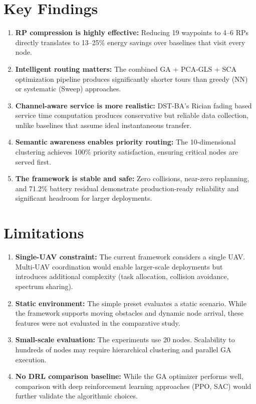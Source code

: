 \documentclass[12pt, a4paper, oneside]{report}
\begin{document}
\section{Key Findings}

\begin{enumerate}
    \item \textbf{RP compression is highly effective:} Reducing 19 waypoints to 4--6 RPs directly translates to 13--25\% energy savings over baselines that visit every node.

    \item \textbf{Intelligent routing matters:} The combined GA + PCA-GLS + SCA optimization pipeline produces significantly shorter tours than greedy (NN) or systematic (Sweep) approaches.

    \item \textbf{Channel-aware service is more realistic:} DST-BA's Rician fading based service time computation produces conservative but reliable data collection, unlike baselines that assume ideal instantaneous transfer.

    \item \textbf{Semantic awareness enables priority routing:} The 10-dimensional clustering achieves 100\% priority satisfaction, ensuring critical nodes are served first.

    \item \textbf{The framework is stable and safe:} Zero collisions, near-zero replanning, and 71.2\% battery residual demonstrate production-ready reliability and significant headroom for larger deployments.
\end{enumerate}

\section{Limitations}

\begin{enumerate}
    \item \textbf{Single-UAV constraint:} The current framework considers a single UAV. Multi-UAV coordination would enable larger-scale deployments but introduces additional complexity (task allocation, collision avoidance, spectrum sharing).

    \item \textbf{Static environment:} The simple preset evaluates a static scenario. While the framework supports moving obstacles and dynamic node arrival, these features were not evaluated in the comparative study.

    \item \textbf{Small-scale evaluation:} The experiments use 20 nodes. Scalability to hundreds of nodes may require hierarchical clustering and parallel GA execution.

    \item \textbf{No DRL comparison baseline:} While the GA optimizer performs well, comparison with deep reinforcement learning approaches (PPO, SAC) would further validate the algorithmic choices.
\end{enumerate}
\end{document}
